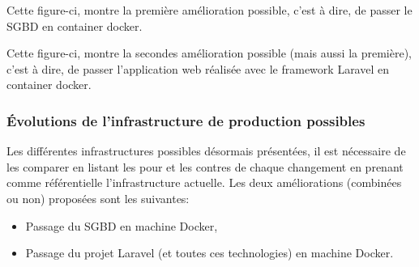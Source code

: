 \documentclass[
    iai, %
    il, %
]{heig-tb}
\begin{document}
Cette figure-ci, montre la première amélioration possible, c'est à dire, de passer le SGBD en container docker.

Cette figure-ci, montre la secondes amélioration possible (mais aussi la première), c'est à dire, de passer l'application web réalisée avec le framework Laravel en container docker.

\subsubsection{Évolutions de l'infrastructure de production possibles}
Les différentes infrastructures possibles désormais présentées, il est nécessaire de les comparer en listant les pour et les contres de chaque changement en prenant comme référentielle l'infrastructure actuelle.\newline
Les deux améliorations (combinées ou non) proposées sont les suivantes:
\begin{itemize}
    \item Passage du SGBD en machine Docker,
    \item Passage du projet Laravel (et toutes ces technologies) en machine Docker.
\end{itemize}
\end{document}
